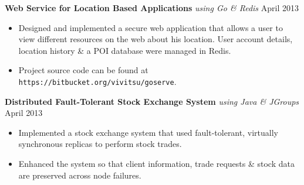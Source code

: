 \documentclass[10pt]{article}
\begin{document}
\textbf{Web Service for Location Based Applications} \textit{using Go \& Redis} \hfill April 2013
\begin{itemize}
    \item Designed and implemented a secure web application that allows a user to view different resources on the web about his location. User account details, location history \& a POI database were managed in Redis.
    \item Project source code can be found at \texttt{https://bitbucket.org/vivitsu/goserve}.
\end{itemize}


\textbf{Distributed Fault-Tolerant Stock Exchange System} \textit{using Java \& JGroups} \hfill April 2013
\begin{itemize}
    \item Implemented a stock exchange system that used fault-tolerant, virtually synchronous replicas to perform stock trades.
    \item Enhanced the system so that client information, trade requests \& stock data are preserved across node failures. %
\end{itemize}

\end{document}
